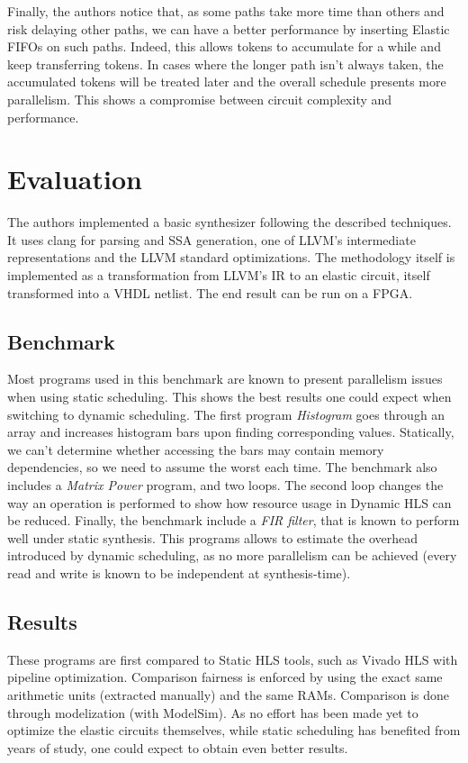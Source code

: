 \documentclass{article}
\begin{document}
Finally, the authors notice that, as some paths take more time than others and risk delaying other paths, we can have a better performance by inserting Elastic FIFOs on such paths. Indeed, this allows tokens to accumulate for a while and keep transferring tokens. In cases where the longer path isn't always taken, the accumulated tokens will be treated later and the overall schedule presents more parallelism. This shows a compromise between circuit complexity and performance.


\section{Evaluation}
The authors implemented a basic synthesizer following the described techniques.
It uses clang for parsing and SSA generation, one of LLVM's intermediate representations and the LLVM standard optimizations.
The methodology itself is implemented as a transformation from LLVM's IR to an elastic circuit, itself transformed into a VHDL netlist. The end result can be run on a FPGA.

\subsection{Benchmark}
Most programs used in this benchmark are known to present parallelism issues when using static scheduling. This shows the best results one could expect when switching to dynamic scheduling.
The first program \textit{Histogram} goes through an array and increases histogram bars upon finding corresponding values. Statically, we can't determine whether accessing the bars may contain memory dependencies, so we need to assume the worst each time.
The benchmark also includes a \textit{Matrix Power} program, and two loops. The second loop changes the way an operation is performed to show how resource usage in Dynamic HLS can be reduced.
Finally, the benchmark include a \textit{FIR filter}, that is known to perform well under static synthesis. This programs allows to estimate the overhead introduced by dynamic scheduling, as no more parallelism can be achieved (every read and write is known to be independent at synthesis-time).

\subsection{Results}
These programs are first compared to Static HLS tools, such as Vivado HLS with pipeline optimization. Comparison fairness is enforced by using the exact same arithmetic units (extracted manually) and the same RAMs.
Comparison is done through modelization (with ModelSim).
As no effort has been made yet to optimize the elastic circuits themselves, while static scheduling has benefited from years of study, one could expect to obtain even better results.
\end{document}
